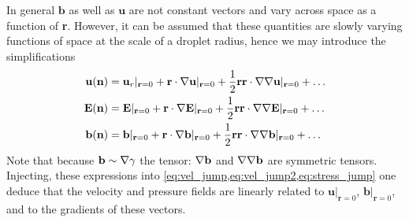 In general $\textbf{b}$ as well as $\textbf{u}$ are not constant vectors and vary across space as a function of \textbf{r}. 
However, it can be assumed that these quantities are slowly varying functions of space at the scale of a droplet radius, hence we may introduce the simplifications 
\begin{align*}
    \textbf{u}(\textbf{n}) 
    &=  \textbf{u}_r|_{\textbf{r}=0}
    +  \textbf{r} \cdot  \mathbf{\nabla}\textbf{u}|_{\textbf{r}=0}
    +  \frac{1}{2}\textbf{rr} \cdot  \mathbf{\nabla}\mathbf{\nabla}\textbf{u}|_{\textbf{r}=0}
    + \ldots\\
     \textbf{E}(\textbf{n}) 
    &=   \textbf{E}|_{\textbf{r}=0}
    + \textbf{r} \cdot  \mathbf{\nabla} \textbf{E}|_{\textbf{r}=0}
    + \frac{1}{2}\textbf{rr} \cdot  \mathbf{\nabla}\mathbf{\nabla} \textbf{E}|_{\textbf{r}=0}
    + \ldots\\
     \textbf{b}(\textbf{n}) 
    &=   \textbf{b}|_{\textbf{r}=0}
    + \textbf{r} \cdot  \mathbf{\nabla} \textbf{b}|_{\textbf{r}=0}
    + \frac{1}{2}\textbf{rr} \cdot  \mathbf{\nabla}\mathbf{\nabla} \textbf{b}|_{\textbf{r}=0}
    + \ldots
\end{align*}
Note that because $\textbf{b} \sim \mathbf{\nabla} \gamma$ the tensor: $\mathbf{\nabla} \textbf{b}$ and $\mathbf{\nabla}\mathbf{\nabla} \textbf{b}$ are symmetric tensors. 
Injecting, these expressions into \ref{eq:vel_jump,eq:vel_jump2,eq:stress_jump} one deduce that the velocity and pressure fields are linearly related to $\textbf{u}|_{\textbf{r}=0}$, $\textbf{b}|_{\textbf{r}=0}$, and to the gradients of these vectors. 

